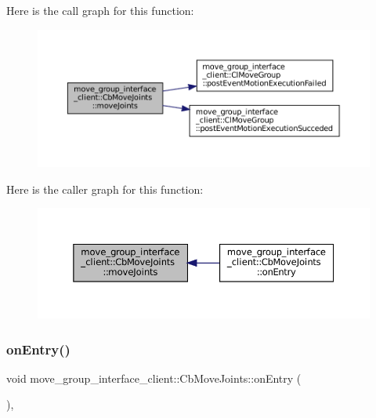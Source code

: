 Here is the call graph for this function\+:
\nopagebreak
\begin{figure}[H]
\begin{center}
\leavevmode
\includegraphics[width=350pt]{classmove__group__interface__client_1_1CbMoveJoints_aa60670293a8fafcb6e091b85af722822_cgraph}
\end{center}
\end{figure}
Here is the caller graph for this function\+:
\nopagebreak
\begin{figure}[H]
\begin{center}
\leavevmode
\includegraphics[width=350pt]{classmove__group__interface__client_1_1CbMoveJoints_aa60670293a8fafcb6e091b85af722822_icgraph}
\end{center}
\end{figure}
\mbox{\label{classmove__group__interface__client_1_1CbMoveJoints_af1e51367bb28be09704ab3747afff1f1}} 
\subsubsection{\texorpdfstring{on\+Entry()}{onEntry()}}
{\footnotesize\ttfamily void move\+\_\+group\+\_\+interface\+\_\+client\+::\+Cb\+Move\+Joints\+::on\+Entry (\begin{DoxyParamCaption}{ }\end{DoxyParamCaption})\hspace{0.3cm}{\ttfamily [override]}, {\ttfamily [virtual]}}



